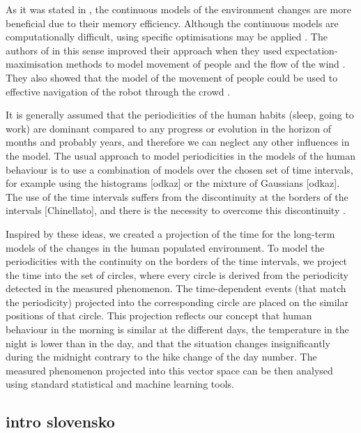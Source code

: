 As it was stated in \cite{o2012gaussian}, the continuous models of the environment changes are more beneficial due to their memory efficiency.
Although the continuous models are computationally difficult, using specific optimisations may be applied \cite{ramos2016hilbert}.
The authors of \cite{kucner2013conditional} in this sense improved their approach when they used expectation-maximisation methods to model movement of people and the flow of the wind \cite{kucner2017enabling}.
They also showed that the model of the movement of people could be used to effective navigation of the robot through the crowd \cite{palmieri2017kinodynamic}.

It is generally assumed that the periodicities of the human habits (sleep, going to work) are dominant compared to any progress or evolution in the horizon of months and probably years, and therefore we can neglect any other influences in the model.
The usual approach to model periodicities in the models of the human behaviour is to use a combination of models over the chosen set of time intervals, for example using the histograms [odkaz] or the mixture of Gaussians [odkaz].
The use of the time intervals suffers from the discontinuity at the borders of the intervals [Chinellato], and there is the necessity to overcome this discontinuity \cite{chinellato2017incremental}.

Inspired by these ideas, we created a projection of the time for the long-term models of the changes in the human populated environment.
To model the periodicities with the continuity on the borders of the time intervals, we project the time into the set of circles, where every circle is derived from the periodicity detected in the measured phenomenon.
The time-dependent events (that match the periodicity) projected into the corresponding circle are placed on the similar positions of that circle.
This projection reflects our concept that human behaviour in the morning is similar at the different days, the temperature in the night is lower than in the day, and that the situation changes insignificantly during the midnight contrary to the hike change of the day number.
The measured phenomenon projected into this vector space can be then analysed using standard statistical and machine learning tools.

\subsection{intro slovensko}

